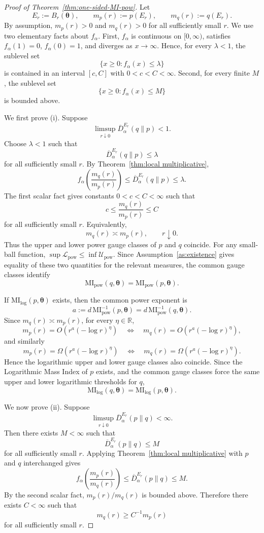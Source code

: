 \documentclass[11pt,a4paper]{article}
\newcommand{\MI}{\mathrm{MI}}
\newcommand{\pa}{\boldsymbol\theta}
\theoremstyle{compactplain}
\theoremstyle{compactdefinition}
\numberwithin{equation}{section}
\begin{document}
\begin{proof}[Proof of Theorem~\ref{thm:one-sided-MI-pow}]
Let
\[
 E_r:=B_r(\pa),
 \qquad
 m_p(r):=p(E_r),
 \qquad
 m_q(r):=q(E_r).
\]
By assumption, \(m_p(r)>0\) and \(m_q(r)>0\) for all sufficiently small \(r\).
We use two elementary facts about \(f_\alpha\). First, \(f_\alpha\) is continuous
on \([0,\infty)\), satisfies \(f_\alpha(1)=0\), \(f_\alpha(0)=1\), and diverges
as \(x\to\infty\). Hence, for every \(\lambda<1\), the sublevel set
\[
 \{x\ge0:f_\alpha(x)\le\lambda\}
\]
is contained in an interval \([c,C]\) with \(0<c<C<\infty\). Second, for every
finite \(M\), the sublevel set
\[
 \{x\ge0:f_\alpha(x)\le M\}
\]
is bounded above.

We first prove \textnormal{(i)}. Suppose
\[
 \limsup_{r\downarrow0}\overline D_\alpha^{E_r}(q\|p)<1 .
\]
Choose \(\lambda<1\) such that
\[
 \overline D_\alpha^{E_r}(q\|p)\le\lambda
\]
for all sufficiently small \(r\). By Theorem~\ref{thm:local multiplicative},
\[
 f_\alpha\!\left(\frac{m_q(r)}{m_p(r)}\right)
 \le
 \overline D_\alpha^{E_r}(q\|p)
 \le\lambda .
\]
The first scalar fact gives constants \(0<c<C<\infty\) such that
\[
 c\le\frac{m_q(r)}{m_p(r)}\le C
\]
for all sufficiently small \(r\). Equivalently,
\[
 m_q(r)\asymp m_p(r),
 \qquad r\downarrow0 .
\]
Thus the upper and lower power gauge classes of \(p\) and \(q\) coincide. For
any small-ball function, \(\sup\mathcal L_{\mathrm{pow}}\le
\inf\mathcal U_{\mathrm{pow}}\). Since Assumption~\ref{as:existence} gives equality of these two
quantities for the relevant measures, the common gauge classes identify
\[
 \MI_{\mathrm{pow}}(q,\pa)=\MI_{\mathrm{pow}}(p,\pa).
\]

If \(\MI_{\mathrm{log}}(p,\pa)\) exists, then the common power exponent is
\[
 a:=d\,\MI_{\mathrm{pow}}^{-1}(p,\pa)
 =d\,\MI_{\mathrm{pow}}^{-1}(q,\pa).
\]
Since \(m_q(r)\asymp m_p(r)\), for every \(\eta\in\mathbb R\),
\[
 m_p(r)=O\!\left(r^a(-\log r)^\eta\right)
 \quad\Longleftrightarrow\quad
 m_q(r)=O\!\left(r^a(-\log r)^\eta\right),
\]
and similarly
\[
 m_p(r)=\Omega\!\left(r^a(-\log r)^\eta\right)
 \quad\Longleftrightarrow\quad
 m_q(r)=\Omega\!\left(r^a(-\log r)^\eta\right).
\]
Hence the logarithmic upper and lower gauge classes also coincide. Since the
Logarithmic Mass Index of \(p\) exists, and the common gauge classes force the
same upper and lower logarithmic thresholds for \(q\),
\[
 \MI_{\mathrm{log}}(q,\pa)=\MI_{\mathrm{log}}(p,\pa).
\]

We now prove \textnormal{(ii)}. Suppose
\[
 \limsup_{r\downarrow0}\overline D_\alpha^{E_r}(p\|q)<\infty .
\]
Then there exists \(M<\infty\) such that
\[
 \overline D_\alpha^{E_r}(p\|q)\le M
\]
for all sufficiently small \(r\). Applying Theorem~\ref{thm:local multiplicative} with \(p\) and \(q\)
interchanged gives
\[
 f_\alpha\!\left(\frac{m_p(r)}{m_q(r)}\right)
 \le
 \overline D_\alpha^{E_r}(p\|q)
 \le M .
\]
By the second scalar fact, \(m_p(r)/m_q(r)\) is bounded above. Therefore there
exists \(C<\infty\) such that
\[
 m_q(r)\ge C^{-1}m_p(r)
\]
for all sufficiently small \(r\).


\end{proof}
\end{document}
